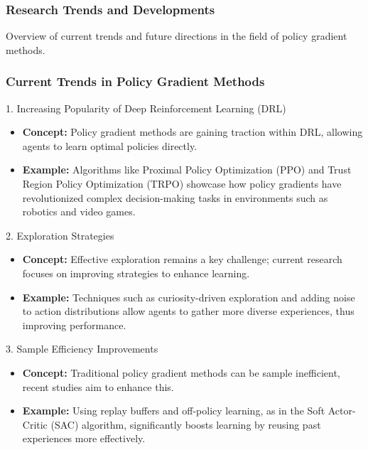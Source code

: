 \documentclass[aspectratio=169]{beamer}
\begin{document}
\begin{frame}[fragile]
    \frametitle{Research Trends and Developments}
    Overview of current trends and future directions in the field of policy gradient methods.
\end{frame}

\begin{frame}[fragile]
    \frametitle{Current Trends in Policy Gradient Methods}
    
    \begin{block}{1. Increasing Popularity of Deep Reinforcement Learning (DRL)}
        \begin{itemize}
            \item \textbf{Concept:} Policy gradient methods are gaining traction within DRL, allowing agents to learn optimal policies directly.
            \item \textbf{Example:} Algorithms like Proximal Policy Optimization (PPO) and Trust Region Policy Optimization (TRPO) showcase how policy gradients have revolutionized complex decision-making tasks in environments such as robotics and video games.
        \end{itemize}
    \end{block}

    \begin{block}{2. Exploration Strategies}
        \begin{itemize}
            \item \textbf{Concept:} Effective exploration remains a key challenge; current research focuses on improving strategies to enhance learning.
            \item \textbf{Example:} Techniques such as curiosity-driven exploration and adding noise to action distributions allow agents to gather more diverse experiences, thus improving performance.
        \end{itemize}
    \end{block}
    
    \begin{block}{3. Sample Efficiency Improvements}
        \begin{itemize}
            \item \textbf{Concept:} Traditional policy gradient methods can be sample inefficient, recent studies aim to enhance this.
            \item \textbf{Example:} Using replay buffers and off-policy learning, as in the Soft Actor-Critic (SAC) algorithm, significantly boosts learning by reusing past experiences more effectively.
        \end{itemize}
    \end{block}
\end{frame}
\end{document}
